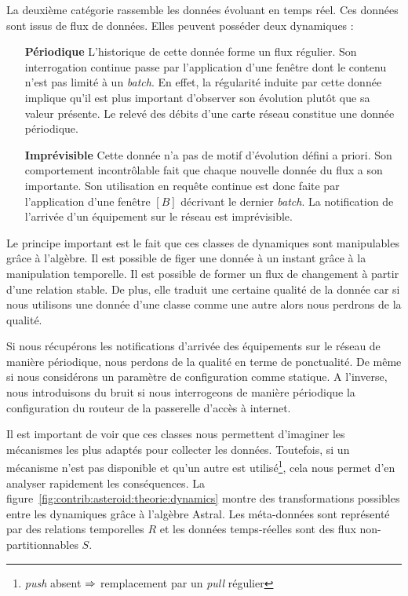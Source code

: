 La deuxième catégorie rassemble les données évoluant en temps réel. Ces données sont issus de flux de données. Elles peuvent posséder deux dynamiques :
\begin{itemize}
	\item[\textbf{Périodique}] L'historique de cette donnée forme un flux régulier. Son interrogation continue passe par l'application d'une fenêtre dont le contenu n'est pas limité à un \textit{batch}. En effet, la régularité induite par cette donnée implique qu'il est plus important d'observer son évolution plutôt que sa valeur présente. Le relevé des débits d'une carte réseau constitue une donnée périodique.
	\item[\textbf{Imprévisible}] Cette donnée n'a pas de motif d'évolution défini a priori. Son comportement incontrôlable fait que chaque nouvelle donnée du flux a son importante. Son utilisation en requête continue est donc faite par l'application d'une fenêtre $[B]$ décrivant le dernier \textit{batch}. La notification de l'arrivée d'un équipement sur le réseau est imprévisible.
\end{itemize}

Le principe important est le fait que ces classes de dynamiques sont manipulables grâce à l'algèbre. Il est possible de figer une donnée à un instant grâce à la manipulation temporelle. Il est possible de former un flux de changement à partir d'une relation stable. De plus, elle traduit une certaine qualité de la donnée car si nous utilisons une donnée d'une classe comme une autre alors nous perdrons de la qualité.
\begin{example}
	Si nous récupérons les notifications d'arrivée des équipements sur le réseau de manière périodique, nous perdons de la qualité en terme de ponctualité. De même si nous considérons un paramètre de configuration comme statique. A l'inverse, nous introduisons du bruit si nous interrogeons de manière périodique la configuration du routeur de la passerelle d'accès à internet.
\end{example}

Il est important de voir que ces classes nous permettent d'imaginer les mécanismes les plus adaptés pour collecter les données. Toutefois, si un mécanisme n'est pas disponible et qu'un autre est utilisé\footnote{\textit{push} absent $\Rightarrow$ remplacement par un \textit{pull} régulier}, cela nous permet d'en analyser rapidement les conséquences. La figure~\ref{fig:contrib:asteroid:theorie:dynamics} montre des transformations possibles entre les dynamiques grâce à l'algèbre Astral. Les méta-données sont représenté par des relations temporelles $R$ et les données temps-réelles sont des flux non-partitionnables $S$.

